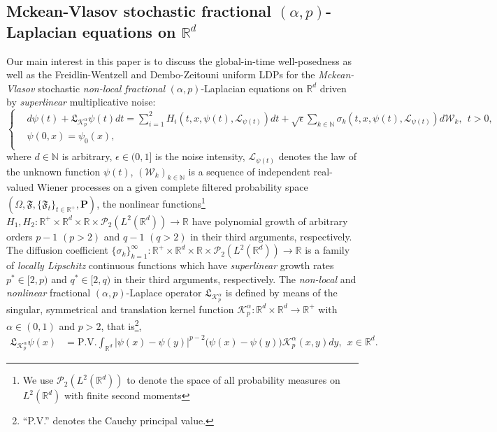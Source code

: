 \documentclass[11pt]{article}
\numberwithin{equation}{section}
\begin{document}
\subsection{Mckean-Vlasov
stochastic fractional $(\alpha,p)$-Laplacian equations on $\mathbb{R}^d$}
Our main interest in this paper is to discuss
the global-in-time well-posedness as well as the Freidlin-Wentzell and Dembo-Zeitouni uniform
LDPs
for the
\emph{Mckean-Vlasov}
stochastic \emph{non-local fractional} $(\alpha,p)$-Laplacian equations on  $\mathbb{R}^d$ driven by \emph{superlinear}
multiplicative noise:
\begin{equation}\label{Int19-}
\left\{
  \begin{aligned}
  &d \psi(t)+ \mathfrak{L}_{\mathcal{K}_{p}^\alpha} \psi(t) dt
=\sum_{i=1}^2H_i(t,x,\psi(t),\mathcal{L}_{
\psi(t)})dt
+ \sqrt{\epsilon}\sum_{k\in\mathbb{N}} \sigma_{k}(t,x,\psi(t),\mathcal{L}_{
\psi(t)}) d\mathcal{W}_k, \ \ t>0, \\
  &\psi(0,x)=\psi_0(x),\\
  \end{aligned}
\right.
\end{equation}
where $d\in \mathbb{N}$ is arbitrary, $\epsilon\in(0,1]$ is the noise intensity,
$\mathcal{L}_{
\psi(t)}$ denotes the law of the unknown
function $\psi(t)$, $(\mathcal{W}_{k})_{k\in\mathbb{N}}$ is a sequence of independent real-valued
Wiener processes on a given complete filtered probability space $(\Omega,\mathfrak{F}, \{\mathfrak{F}_t\}_{t\in\mathbb{R}^+},\textbf{P})$, the nonlinear functions\footnote{We use $\mathcal{P}_2(L^2(\mathbb{R}^d))$ to denote the space of all probability measures on $L^2(\mathbb{R}^d)$ with finite second moments}
$H_1,H_2:\mathbb{R}^+\times\mathbb{R}^d
\times\mathbb{R}\times\mathcal{P}_2(L^2(\mathbb{R}^d))\rightarrow\mathbb{R}$ have polynomial growth of arbitrary orders
$p-1$ $(p>2)$ and $q-1$ $(q>2)$ in their third arguments, respectively. The diffusion coefficient $\{\sigma_k\}_{k=1}^\infty:\mathbb{R}^+
 \times\mathbb{R}^d
\times\mathbb{R}\times
\mathcal{P}_2(L^2(\mathbb{R}^d))
\rightarrow\mathbb{R}$ is a family of \emph{locally Lipschitz} continuous functions which have \emph{superlinear}
 growth rates $p^*\in[2,p)$ and $q^*\in[2,q)$ in their third arguments, respectively. The \emph{non-local} and \emph{nonlinear} fractional  $(\alpha,p)$-Laplace
operator $\mathfrak{L}_{\mathcal{K}_{p}^\alpha}$
is defined by means of the singular, symmetrical and translation kernel function $\mathcal{K}_{p}^\alpha:\mathbb{R}^d\times
\mathbb{R}^d\rightarrow\mathbb{R}^+$ with $\alpha\in(0,1)$ and $p>2$, that is\footnote{ ``P.V.'' denotes the Cauchy  principal value.},
\begin{align}\label{integro-differential}
\mathfrak{L}_{\mathcal{K}_{p}^\alpha} \psi
(x)
&= \mbox{P.V.}\int_{\mathbb{R}^d}
|\psi(x)-\psi(y)|^{p-2}\big(\psi(x)-\psi(y)\big) \mathcal{K}_{p}^\alpha(x,y)dy,\ \ x\in\mathbb{R}^d.
 \end{align}
\end{document}
